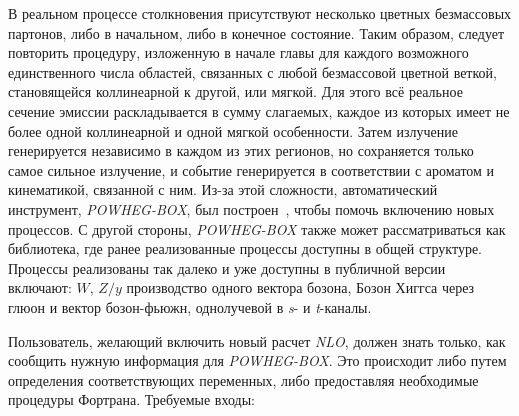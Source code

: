 В реальном процессе столкновения присутствуют несколько цветных безмассовых партонов, либо в начальном, либо в
конечное состояние. Таким образом, следует повторить процедуру, изложенную в начале главы для каждого возможного единственного числа
областей, связанных с любой безмассовой цветной веткой, становящейся коллинеарной к другой, или мягкой.
Для этого всё реальное сечение эмиссии раскладывается в сумму слагаемых, каждое
из которых имеет не более одной коллинеарной и одной мягкой особенности. Затем излучение генерируется
независимо в каждом из этих регионов, но сохраняется только самое сильное излучение, и событие
генерируется в соответствии с ароматом и кинематикой, связанной с ним. Из-за этой сложности,
автоматический инструмент, \textit{POWHEG-BOX}, был построен~\cite{review-powheg}, чтобы помочь включению новых
процессов. С другой стороны, \textit{POWHEG-BOX} также может рассматриваться как библиотека, где ранее
реализованные процессы доступны в общей структуре. Процессы реализованы так
далеко и уже доступны в публичной версии включают: $W$, $Z / y$ производство одного вектора бозона,
Бозон Хиггса через глюон и вектор бозон-фьюжн, однолучевой в \textit{s}- и \textit{t}-каналы.

Пользователь, желающий включить новый расчет \textit{NLO}, должен знать только, как сообщить
нужную информация для \textit{POWHEG-BOX}. Это происходит либо путем определения соответствующих переменных,
либо предоставляя необходимые процедуры Фортрана. Требуемые входы:

